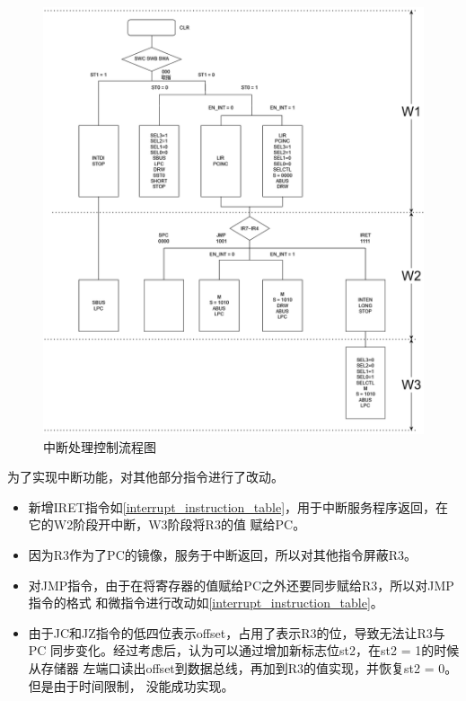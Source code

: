 \begin{figure}[h]
    \centering
    \label{interrupt_control_flow}
    \includegraphics[width=\textwidth]{figures/interrupt_control_flow.drawio.png}
    \caption{中断处理控制流程图}
\end{figure}
为了实现中断功能，对其他部分指令进行了改动。
\begin{itemize}
    \item 新增IRET指令如\ref{interrupt_instruction_table}，用于中断服务程序返回，在它的W2阶段开中断，W3阶段将R3的值
          赋给PC。
    \item 因为R3作为了PC的镜像，服务于中断返回，所以对其他指令屏蔽R3。
    \item 对JMP指令，由于在将寄存器的值赋给PC之外还要同步赋给R3，所以对JMP指令的格式
          和微指令进行改动如\ref{interrupt_instruction_table}。
    \item 由于JC和JZ指令的低四位表示offset，占用了表示R3的位，导致无法让R3与PC
          同步变化。经过考虑后，认为可以通过增加新标志位st2，在st2 = 1的时候从存储器
          左端口读出offset到数据总线，再加到R3的值实现，并恢复st2 = 0。但是由于时间限制，
          没能成功实现。
\end{itemize}
